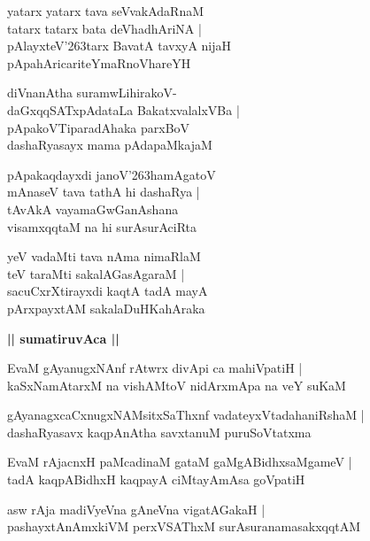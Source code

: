 \documentclass[twoside,12pt,openright]{book}
\def\S{\char'263}
\newcounter{shloka}[chapter]
\def\uvaca#1{\centerline{{\large\textbf{#1}}}}
\begin{document}
\begin{shloka}%
yatarx yatarx tava seVvakAdaRnaM \\
tatarx tatarx bata deVhadhAriNA |\\
pAlayxteV\S tarx BavatA tavxyA nijaH \\
pApahAricariteYmaRnoVhareYH
\end{shloka}

\begin{shloka}%
diVnanAtha suramwLihirakoV- \\
daGxqqSATxpAdataLa BakatxvalalxVBa |\\
pApakoVTiparadAhaka parxBoV \\
dashaRyasayx mama pAdapaMkajaM 
\end{shloka}

\begin{shloka}%
pApakaqdayxdi janoV\S hamAgatoV \\
mAnaseV tava tathA hi dashaRya |\\
tAvAkA vayamaGwGanAshana \\
visamxqqtaM na hi surAsurAciRta
\end{shloka}

\begin{shloka}%
yeV vadaMti tava nAma nimaRlaM \\
teV taraMti sakalAGasAgaraM |\\
sacuCxrXtirayxdi kaqtA tadA mayA \\
pArxpayxtAM sakalaDuHKahAraka
\end{shloka}

\uvaca{|| sumatiruvAca ||}

\begin{shloka}%
EvaM gAyanugxNAnf rAtwrx divApi ca mahiVpatiH |\\
kaSxNamAtarxM na vishAMtoV nidArxmApa na veY suKaM 
\end{shloka}

\begin{shloka}%
gAyanagxcaCxnugxNAMsitxSaThxnf vadateyxVtadahaniRshaM |\\
dashaRyasavx kaqpAnAtha savxtanuM puruSoVtatxma
\end{shloka}

\begin{shloka}%
EvaM rAjacnxH paMcadinaM gataM gaMgABidhxsaMgameV |\\
tadA kaqpABidhxH kaqpayA ciMtayAmAsa goVpatiH
\end{shloka}

\begin{shloka}%
asw rAja madiVyeVna gAneVna vigatAGakaH |\\
pashayxtAnAmxkiVM perxVSAThxM surAsuranamasakxqqtAM 
\end{shloka}
\end{document}

